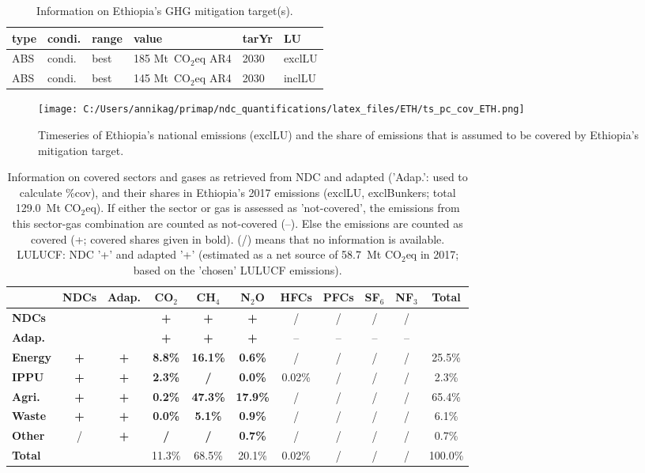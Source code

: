 \documentclass[12pt]{article}
\begin{document}
 \begin{table}[H]
 \centering
 \caption{Information on Ethiopia's GHG mitigation target(s).}
 \label{tab:mitiTars}
 \begin{tabular}{l l l l l l }
 \bfseries type & \bfseries condi. & \bfseries range & \bfseries value & \bfseries tarYr & \bfseries LU \tabularnewline \hline \hline
 ABS & condi. & best & 185 Mt~CO$_2$eq AR4 & 2030 & exclLU \tabularnewline 
 ABS & condi. & best & 145 Mt~CO$_2$eq AR4 & 2030 & inclLU \tabularnewline 
 \end{tabular}
 \end{table}

 \begin{figure}[H]
 \centering
 \texttt{[image: C:/Users/annikag/primap/ndc\_quantifications/latex\_files/ETH/ts\_pc\_cov\_ETH.png]}
 \caption{Timeseries of Ethiopia's national emissions (exclLU) and the share of emissions that is assumed to be covered by Ethiopia's mitigation target.}
 \label{fig:tsPcCov}
 \end{figure}

 \begin{table}[H]\small
 \centering
 \caption{Information on covered sectors and gases as retrieved from NDC and adapted ('Adap.': used to calculate \%cov), and their shares in Ethiopia's 2017 emissions (exclLU, exclBunkers; total 129.0~Mt CO$_2$eq).
 If either the sector or gas is assessed as 'not-covered', the emissions from this sector-gas combination are counted as not-covered (--). 
 Else the emissions are counted as covered (+; covered shares given in bold).
 (/) means that no information is available.
 LULUCF: NDC '+' and adapted '+' (estimated as a net source of 58.7~Mt CO$_2$eq in 2017; based on the 'chosen' LULUCF emissions).}
 \label{tab:coveredSectorsGases}
 \begin{tabular}{l || c c || c c c c c c c | c}
 \bfseries  & \bfseries NDCs & \bfseries Adap. & \bfseries CO$_2$ & \bfseries CH$_4$ & \bfseries N$_2$O & \bfseries HFCs & \bfseries PFCs & \bfseries SF$_6$ & \bfseries NF$_3$ & \bfseries Total \tabularnewline \hline \hline
 \bfseries NDCs &  &  & \bfseries + & \bfseries + & \bfseries + & / & / & / & / &  \tabularnewline 
 \bfseries Adap. &  &  & \bfseries + & \bfseries + & \bfseries + & -- & -- & -- & -- &  \tabularnewline \hline \hline
 \bfseries Energy & \bfseries + & \bfseries + & \bfseries 8.8\% & \bfseries 16.1\% & \bfseries 0.6\% & / & / & / & / & 25.5\% \tabularnewline 
 \bfseries IPPU & \bfseries + & \bfseries + & \bfseries 2.3\% & \bfseries / & \bfseries 0.0\% & 0.02\% & / & / & / & 2.3\% \tabularnewline 
 \bfseries Agri. & \bfseries + & \bfseries + & \bfseries 0.2\% & \bfseries 47.3\% & \bfseries 17.9\% & / & / & / & / & 65.4\% \tabularnewline 
 \bfseries Waste & \bfseries + & \bfseries + & \bfseries 0.0\% & \bfseries 5.1\% & \bfseries 0.9\% & / & / & / & / & 6.1\% \tabularnewline 
 \bfseries Other & / & \bfseries + & \bfseries / & \bfseries / & \bfseries 0.7\% & / & / & / & / & 0.7\% \tabularnewline \hline
 \bfseries Total &  &  & 11.3\% & 68.5\% & 20.1\% & 0.02\% & / & / & / & 100.0\% \tabularnewline 
 \end{tabular}
 \end{table}
\end{document}
